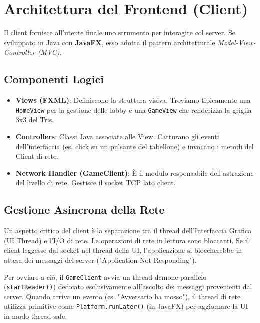 \documentclass[11pt, a4paper]{article}
\begin{document}
\newpage
\section{Architettura del Frontend (Client)}

Il client fornisce all'utente finale uno strumento per interagire col server. Se sviluppato in Java con \textbf{JavaFX}, esso adotta il pattern architetturale \textit{Model-View-Controller (MVC)}.

\subsection{Componenti Logici}
\begin{itemize}
    \item \textbf{Views (FXML)}: Definiscono la struttura visiva. Troviamo tipicamente una \texttt{HomeView} per la gestione delle lobby e una \texttt{GameView} che renderizza la griglia 3x3 del Tris.
    \item \textbf{Controllers}: Classi Java associate alle View. Catturano gli eventi dell'interfaccia (es. click su un pulsante del tabellone) e invocano i metodi del Client di rete.
    \item \textbf{Network Handler (GameClient)}: È il modulo responsabile dell'astrazione del livello di rete. Gestisce il socket TCP lato client.
\end{itemize}

\subsection{Gestione Asincrona della Rete}
Un aspetto critico del client è la separazione tra il thread dell'Interfaccia Grafica (UI Thread) e l'I/O di rete. Le operazioni di rete in lettura sono bloccanti. Se il client leggesse dal socket nel thread della UI, l'applicazione si bloccherebbe in attesa dei messaggi del server ("Application Not Responding").

Per ovviare a ciò, il \texttt{GameClient} avvia un thread demone parallelo (\texttt{startReader()}) dedicato esclusivamente all'ascolto dei messaggi provenienti dal server. Quando arriva un evento (es. "Avversario ha mosso"), il thread di rete utilizza primitive come \texttt{Platform.runLater()} (in JavaFX) per aggiornare la UI in modo thread-safe.

\newpage
\end{document}
